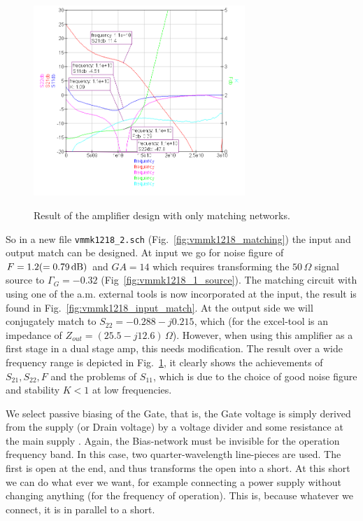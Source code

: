 \begin{figure}
  \centering
  {\includegraphics[width=8cm]{vmmk1218_match_result.png}}
  \caption{Result of the amplifier design with only matching networks.}
  \label{fig:vmmk1218_match_result}
\end{figure}

So in a new file {\tt vmmk1218\_2.sch}
(Fig.~\ref{fig:vmmk1218_matching}) the input and output match can be
designed. At input we go for noise figure of $F=1.2(=0.79\,\mathrm{dB})$
and $GA=14$ which requires transforming the $50\,\Omega$ signal source
to $\Gamma_G=-0.32$ (Fig~\ref{fig:vmmk1218_1_source}). The matching
circuit with using one of the a.m. external tools is now incorporated
at the input, the result is found in
Fig.~\ref{fig:vmmk1218_input_match}. At the output side we will
conjugately match to $S_{22}=-0.288-j0.215$, which (for the excel-tool
is an impedance of $Z_{out}=(25.5-j12.6)\,\Omega$). However, when
using this amplifier as a first stage in a dual stage amp, this needs
modification. The result over a wide frequency range is depicted in
Fig.~\ref{fig:vmmk1218_match_result}, it clearly shows the achievements
of $S_{21},S_{22}, F$ and the problems of $S_{11}$, which is due to
the choice of good noise figure and stability $K<1$ at low
frequencies.

\label{ch:bias1}

We select passive biasing of the Gate, that is, the Gate voltage is
simply derived from the supply (or Drain voltage) by a voltage divider
and some resistance at the main supply \cite{avago_an5385}. Again, the
Bias-network must be invisible for the operation frequency band. In
this case, two quarter-wavelength line-pieces are used. The first is
open at the end, and thus transforms the open into a short. At this
short we can do what ever we want, for example connecting a power
supply without changing anything (for the frequency of
operation). This is, because whatever we connect, it is in parallel to
a short. 

